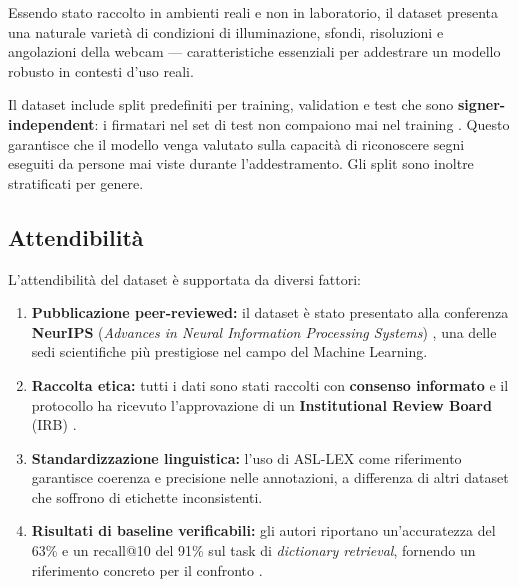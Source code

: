 Essendo stato raccolto in ambienti reali e non in laboratorio, il dataset presenta una naturale varietà di condizioni di illuminazione, sfondi, risoluzioni e angolazioni della webcam --- caratteristiche essenziali per addestrare un modello robusto in contesti d'uso reali.

Il dataset include split predefiniti per training, validation e test che sono \textbf{signer-independent}: i firmatari nel set di test non compaiono mai nel training \cite{desai2024aslcitizen}. Questo garantisce che il modello venga valutato sulla capacità di riconoscere segni eseguiti da persone mai viste durante l'addestramento. Gli split sono inoltre stratificati per genere.

\subsection{Attendibilità}

L'attendibilità del dataset è supportata da diversi fattori:

\begin{enumerate}
    \item \textbf{Pubblicazione peer-reviewed:} il dataset è stato presentato alla conferenza \textbf{NeurIPS} (\textit{Advances in Neural Information Processing Systems}) \cite{desai2024aslcitizen}, una delle sedi scientifiche più prestigiose nel campo del Machine Learning.

    \item \textbf{Raccolta etica:} tutti i dati sono stati raccolti con \textbf{consenso informato} e il protocollo ha ricevuto l'approvazione di un \textbf{Institutional Review Board} (IRB) \cite{desai2024aslcitizen}.

    \item \textbf{Standardizzazione linguistica:} l'uso di ASL-LEX \cite{asllex2017} come riferimento garantisce coerenza e precisione nelle annotazioni, a differenza di altri dataset che soffrono di etichette inconsistenti.

    \item \textbf{Risultati di baseline verificabili:} gli autori riportano un'accuratezza del 63\% e un recall@10 del 91\% sul task di \textit{dictionary retrieval}, fornendo un riferimento concreto per il confronto \cite{desai2024aslcitizen}.
\end{enumerate}
